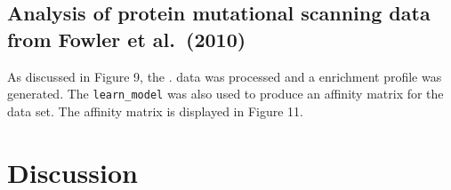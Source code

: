 \documentclass{bmcart}
\begin{document}
\subsection*{Analysis of protein mutational scanning data from Fowler et al.\ (2010)}

    As discussed in Figure 9, the \cite{Fowler:2010gt,Fowler:2014gq}. data was processed and a enrichment
profile was generated. The \texttt{learn\_model} was also used to produce an
affinity matrix for the data set. The affinity matrix is displayed in Figure 11. 

\section*{Discussion}


\end{document}
